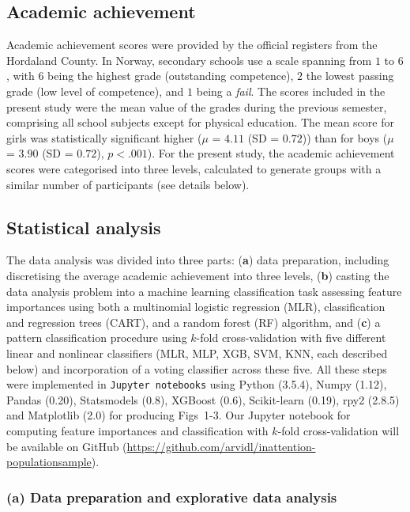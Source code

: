 \documentclass[10pt,letterpaper]{article}
\begin{document}
\subsection*{Academic achievement}
Academic achievement scores were provided by the official registers from the Hordaland County. In Norway, secondary schools use a scale spanning from $1$ to $6$, with $6$ 
being the highest grade (outstanding competence),  $2$  the lowest passing grade (low level of competence), and $1$ being a {\it fail}. 
The scores included in the present study were the mean value of the grades during the previous semester, comprising all school subjects except for physical education. 
The mean score for girls was statistically significant higher  ($\mu$ = $4.11$ (SD = $0.72$)) than for boys {($\mu$ = $3.90$ (SD = $0.72$)}, $p  <  .001$). 
For the present study, the academic achievement scores were categorised into three levels, calculated to generate groups with a similar number of participants (see details below). 



\subsection*{Statistical analysis}
The data analysis was divided into three parts: ({\bf  a}) data preparation, including discretising the average academic achievement into three levels,  ({\bf b}) casting the data analysis problem 
into a machine learning classification task assessing feature importances using both 
a multinomial logistic regression (MLR), classification and regression trees (CART), and a random forest (RF) algorithm, and ({\bf c}) a pattern 
classification procedure using $k$-fold cross-validation with five different linear and nonlinear classifiers (MLR, MLP, XGB, SVM, KNN, each described below) and incorporation of
a voting classifier across  these five.
All these steps were implemented in {\tt Jupyter notebooks}  using Python (3.5.4), Numpy (1.12), Pandas (0.20), Statsmodels (0.8),  XGBoost (0.6), Scikit-learn (0.19),  rpy2 (2.8.5)
and Matplotlib (2.0) for producing Figs~1-3. Our Jupyter notebook for computing feature importances and 
classification with $k$-fold cross-validation will be available on GitHub ({\small \url{https://github.com/arvidl/inattention-populationsample}}).  

\vspace{3mm}

\subsubsection*{(a) Data preparation and explorative data analysis}
\end{document}
